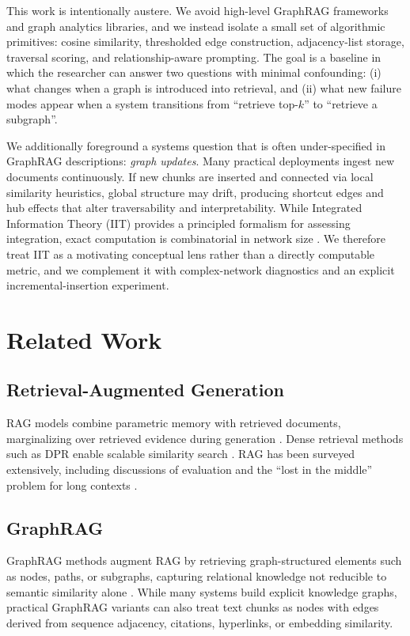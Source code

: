 \documentclass[11pt]{article}
\begin{document}
This work is intentionally austere. We avoid high-level GraphRAG frameworks and graph analytics libraries, and we instead isolate a small set of algorithmic primitives: cosine similarity, thresholded edge construction, adjacency-list storage, traversal scoring, and relationship-aware prompting. The goal is a baseline in which the researcher can answer two questions with minimal confounding: (i) what changes when a graph is introduced into retrieval, and (ii) what new failure modes appear when a system transitions from ``retrieve top-$k$'' to ``retrieve a subgraph''.

We additionally foreground a systems question that is often under-specified in GraphRAG descriptions: \emph{graph updates}. Many practical deployments ingest new documents continuously. If new chunks are inserted and connected via local similarity heuristics, global structure may drift, producing shortcut edges and hub effects that alter traversability and interpretability. While Integrated Information Theory (IIT) provides a principled formalism for assessing integration, exact computation is combinatorial in network size \citep{tononi2004iit,oizumi2014iit3}. We therefore treat IIT as a motivating conceptual lens rather than a directly computable metric, and we complement it with complex-network diagnostics \citep{newman2010networks} and an explicit incremental-insertion experiment.

\section{Related Work}
\subsection{Retrieval-Augmented Generation}
RAG models combine parametric memory with retrieved documents, marginalizing over retrieved evidence during generation \citep{lewis2020rag}. Dense retrieval methods such as DPR enable scalable similarity search \citep{karpukhin2020dpr}. RAG has been surveyed extensively, including discussions of evaluation and the ``lost in the middle'' problem for long contexts \citep{peng2024graphrag_survey}.

\subsection{GraphRAG}
GraphRAG methods augment RAG by retrieving graph-structured elements such as nodes, paths, or subgraphs, capturing relational knowledge not reducible to semantic similarity alone \citep{peng2024graphrag_survey,han2024graphrag_survey}. While many systems build explicit knowledge graphs, practical GraphRAG variants can also treat text chunks as nodes with edges derived from sequence adjacency, citations, hyperlinks, or embedding similarity.
\end{document}
